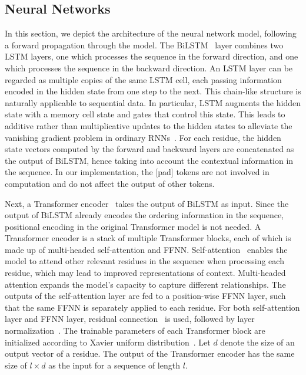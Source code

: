 \documentclass[runningheads]{llncs}
\begin{document}
\subsection{Neural Networks}
In this section, we depict the architecture of the neural network model, following a forward propagation through the model. The BiLSTM~\cite{graves2005framewise} layer combines two LSTM layers, one which processes the sequence in the forward direction, and one which processes the sequence in the backward direction. An LSTM layer can be regarded as multiple copies of the same LSTM cell, each passing information encoded in the hidden state from one step to the next. This chain-like structure is naturally applicable to sequential data. In particular, LSTM augments the hidden state with a memory cell state and gates that control this state. This leads to additive rather than multiplicative updates to the hidden states to alleviate the vanishing gradient problem in ordinary RNNs~\cite{hochreiter1997long}. For each residue, the hidden state vectors computed by the forward and backward layers are concatenated as the output of BiLSTM, hence taking into account the contextual information in the sequence. In our implementation, the [pad] tokens are not involved in computation and do not affect the output of other tokens.

Next, a Transformer encoder~\cite{vaswani2017attention} takes the output of BiLSTM as input. Since the output of BiLSTM already encodes the ordering information in the sequence, positional encoding in the original Transformer model is not needed. A Transformer encoder is a stack of multiple Transformer blocks, each of which is made up of multi-headed self-attention and FFNN. Self-attention~\cite{cheng2016long} enables the model to attend other relevant residues in the sequence when processing each residue, which may lead to improved representations of context. Multi-headed attention expands the model's capacity to capture different relationships. The outputs of the self-attention layer are fed to a position-wise FFNN layer, such that the same FFNN is separately applied to each residue. For both self-attention layer and FFNN layer, residual connection~\cite{he2016deep} is used, followed by layer normalization~\cite{ba2016layer}. The trainable parameters of each Transformer block are initialized according to Xavier uniform distribution~\cite{glorot2010understanding}. Let $d$ denote the size of an output vector of a residue. The output of the Transformer encoder has the same size of $l\times d$ as the input for a sequence of length $l$.
\end{document}
